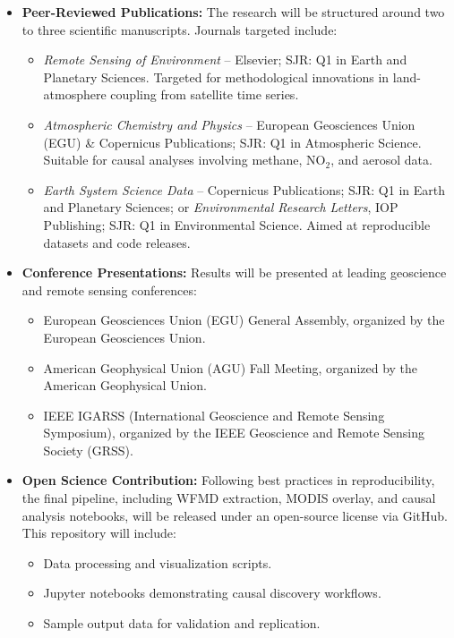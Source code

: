 \begin{itemize}
    \item \textbf{Peer-Reviewed Publications:} The research will be structured around two to three scientific manuscripts. Journals targeted include:
    \begin{itemize}
        \item \textit{Remote Sensing of Environment} – Elsevier; SJR: Q1 in Earth and Planetary Sciences. Targeted for methodological innovations in land-atmosphere coupling from satellite time series.
        \item \textit{Atmospheric Chemistry and Physics} – European Geosciences Union (EGU) \& Copernicus Publications; SJR: Q1 in Atmospheric Science. Suitable for causal analyses involving methane, NO$_2$, and aerosol data.
        \item \textit{Earth System Science Data} – Copernicus Publications; SJR: Q1 in Earth and Planetary Sciences; or \textit{Environmental Research Letters}, IOP Publishing; SJR: Q1 in Environmental Science. Aimed at reproducible datasets and code releases.
    \end{itemize}

    \item \textbf{Conference Presentations:} Results will be presented at leading geoscience and remote sensing conferences:
    \begin{itemize}
        \item European Geosciences Union (EGU) General Assembly, organized by the European Geosciences Union.
        \item American Geophysical Union (AGU) Fall Meeting, organized by the American Geophysical Union.
        \item IEEE IGARSS (International Geoscience and Remote Sensing Symposium), organized by the IEEE Geoscience and Remote Sensing Society (GRSS).
    \end{itemize}

    \item \textbf{Open Science Contribution:} Following best practices in reproducibility, the final pipeline, including WFMD extraction, MODIS overlay, and causal analysis notebooks, will be released under an open-source license via GitHub. This repository will include:
    \begin{itemize}
        \item Data processing and visualization scripts.
        \item Jupyter notebooks demonstrating causal discovery workflows.
        \item Sample output data for validation and replication.
    \end{itemize}


\end{itemize}
